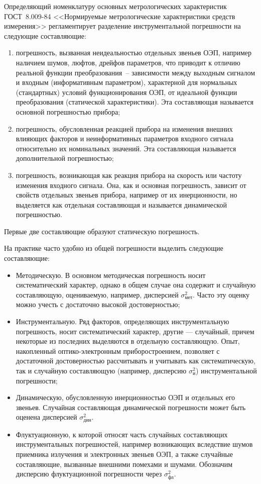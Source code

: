 Определяющий номенклатуру основных метрологических характеристик ГОСТ~8.009-84 <<Нормируемые метрологические характеристики средств измерения>> регламентирует разделение инструментальной погрешности на следующие составляющие:
\begin{enumerate}
\item погрешность, вызванная неидеальностью отдельных звеньев ОЭП, например наличием шумов, люфтов, дрейфов параметров, что приводит к отличию реальной функции преобразования~-- зависимости между выходным сигналом и входным (информативным параметром), характерной для нормальных (стандартных) условий функционирования ОЭП, от идеальной функции преобразования (статической характеристики). Эта составляющая называется основной погрешностью прибора;
\item  погрешность, обусловленная реакцией прибора на изменения внешних влияющих факторов и неинформативных параметров входного сигнала относительно их номинальных значений. Эта составляющая называется дополнительной погрешностью;
\item погрешность, возникающая как реакция прибора на скорость или частоту изменения входного сигнала. Она, как и основная погрешность, зависит от свойств отдельных звеньев прибора, например от их инерционности, но выделяется как отдельная составляющая и называется динамической погрешностью.
\end{enumerate}

Первые две составляющие образуют статическую погрешность.

На практике часто удобно из общей погрешности выделить следующие составляющие:
\begin{itemize}
\item Методическую. В основном методическая погрешность носит систематический характер, однако в общем случае она содержит и случайную составляющую, оцениваемую, например, дисперсией $ \sigma^2_\text{мет} $. Часто эту оценку можно учесть с достаточно высокой достоверностью;
\item Инструментальную. Ряд факторов, определяющих инструментальную погрешность, носит систематический характер, другие --- случайный, причем некоторые из последних выделяются в отдельную составляющую. Опыт, накопленный оптико-электронным приборостроением, позволяет с достаточной достоверностью рассчитывать и учитывать как систематическую, так и случайную составляющую (например, дисперсию $ \sigma^2_\text{и} $) инструментальной погрешности;
\item Динамическую, обусловленную инерционностью ОЭП и отдельных его звеньев. Случайная составляющая динамической погрешности может быть оценена дисперсией  $ \sigma^2_\text{дин} $.
\item Флуктуационную, к которой относят часть случайных составляющих инструментальных погрешностей, например возникающих вследствие шумов приемника излучения и электронных звеньев ОЭП, а также случайные составляющие, вызванные внешними помехами и шумами. Обозначим дисперсию флуктуационной погрешности через $ \sigma^2_\text{фл} $.
\end{itemize}

